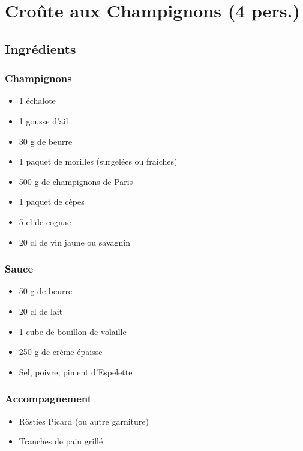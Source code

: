 \section{Croûte aux Champignons (4
pers.)}\label{crouxfbte-aux-champignons-4-pers.}

\subsection{Ingrédients}\label{ingruxe9dients-4}

\subsubsection{Champignons}\label{champignons}

\begin{itemize}

\item
  1 échalote
\item
  1 gousse d'ail
\item
  30 g de beurre
\item
  1 paquet de morilles (surgelées ou fraîches)
\item
  500 g de champignons de Paris
\item
  1 paquet de cèpes
\item
  5 cl de cognac
\item
  20 cl de vin jaune ou savagnin
\end{itemize}

\subsubsection{Sauce}\label{sauce}

\begin{itemize}

\item
  50 g de beurre
\item
  20 cl de lait
\item
  1 cube de bouillon de volaille
\item
  250 g de crème épaisse
\item
  Sel, poivre, piment d'Espelette
\end{itemize}

\subsubsection{Accompagnement}\label{accompagnement}

\begin{itemize}

\item
  Rösties Picard (ou autre garniture)
\item
  Tranches de pain grillé
\end{itemize}

